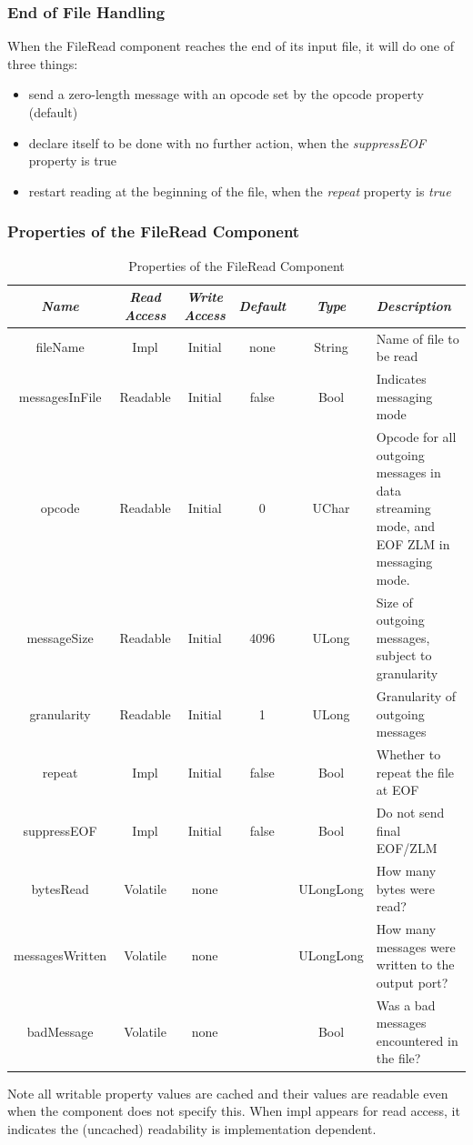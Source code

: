 \documentclass[10pt, a4paper, oneside]{article}
\renewcommand*{\arraystretch}{2.5}%
\renewcommand\_{\textunderscore\allowbreak} %
\begin{document}
\subsubsection{End of File Handling} When the File\_Read component reaches the end of its input file, it will do one of three things:\begin{itemize}
\item send a zero-length message with an opcode set by the opcode property (default)
\item declare itself to be done with no further action, when the \emph{suppressEOF} property is true
\item restart reading at the beginning of the file, when the \emph{repeat} property is \emph{true}
\end{itemize}
\subsubsection{Properties of the File\_Read Component}
\begin{table}[h!]
\caption{Properties of the File\_Read Component}
\renewcommand*{\arraystretch}{2.5}
\begin{tabular}[c]{|c|c|c|c|c|p{5cm}|}  
\hline \emph{Name} & \emph{Read Access} & \emph{Write Access} & \emph{Default} & \emph{Type} & \emph{Description}\\ 
\hline
fileName & Impl & Initial & none & String &	Name of file to be read\\ 
\hline  
messagesInFile & Readable & Initial	& false	& Bool &	Indicates messaging mode\\ 
\hline 
opcode &	Readable & Initial &	0	& UChar	& Opcode for all outgoing messages in data streaming mode, and EOF ZLM in messaging mode.\\ 
\hline 
messageSize & Readable & Initial & 4096 & ULong	& Size of outgoing messages, subject to granularity\\ 
\hline
granularity & Readable & Initial	& 1	& ULong	& Granularity of outgoing messages\\ 
\hline 
repeat &	Impl	& Initial	& false	& Bool	& Whether to repeat the file at EOF\\ 
\hline
suppressEOF & 	Impl & 	Initial & 	false& Bool	& Do not send final EOF/ZLM\\  
\hline 
bytesRead &	Volatile	& none	& {} &	ULongLong &	How many bytes were read?\\ 
\hline 
messagesWritten	& Volatile & none	& {} &	ULongLong &	How many messages were written to the output port?\\ 
\hline 
badMessage	& Volatile & none	& 	{} & Bool	& Was a bad messages encountered in the file?\\ 
\hline
\end{tabular}
\end{table}
Note all writable property values are cached and their values are readable even when the component does not specify this.  When impl appears for read access, it indicates the (uncached) readability is implementation dependent.
\end{document}

